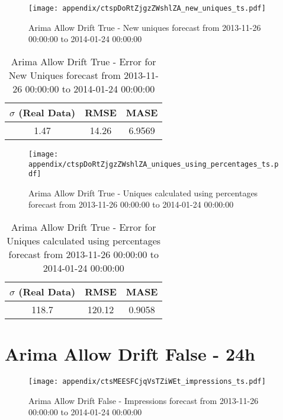 \begin{figure}[H] \begin{center} \leavevmode
\texttt{[image: appendix/ctspDoRtZjgzZWshlZA\_new\_uniques\_ts.pdf]} \caption[]{
Arima Allow Drift True - New uniques forecast from 2013-11-26 00:00:00 to 2014-01-24 00:00:00} \label{fig:appendix/ctspDoRtZjgzZWshlZA_new_uniques_ts.pdf} \end{center}
\end{figure}

\begin{table}[H]
\centering
\footnotesize
\begin{tabular}{ccc}
$\sigma$ (Real Data) & RMSE & MASE   \\ \hline
1.47 & 14.26 & 6.9569 \\
\end{tabular}

\vspace{0.5cm}

\caption[]{
Arima Allow Drift True - Error for New Uniques forecast from 2013-11-26 00:00:00 to 2014-01-24 00:00:00}
\end{table}

\begin{figure}[H] \begin{center} \leavevmode
\texttt{[image: appendix/ctspDoRtZjgzZWshlZA\_uniques\_using\_percentages\_ts.pdf]} \caption[]{
Arima Allow Drift True - Uniques calculated using percentages forecast from 2013-11-26 00:00:00 to 2014-01-24 00:00:00} \label{fig:appendix/ctspDoRtZjgzZWshlZA_uniques_using_percentages_ts.pdf} \end{center}
\end{figure}

\begin{table}[H]
\centering
\footnotesize
\begin{tabular}{ccc}
$\sigma$ (Real Data) & RMSE & MASE   \\ \hline
118.7 & 120.12 & 0.9058 \\
\end{tabular}

\vspace{0.5cm}

\caption[]{
Arima Allow Drift True - Error for Uniques calculated using percentages forecast from 2013-11-26 00:00:00 to 2014-01-24 00:00:00}
\end{table}

\section{Arima Allow Drift False - 24h}
\begin{figure}[H] \begin{center} \leavevmode
\texttt{[image: appendix/ctsMEESFCjqVsTZiWEt\_impressions\_ts.pdf]} \caption[]{
Arima Allow Drift False - Impressions forecast from 2013-11-26 00:00:00 to 2014-01-24 00:00:00} \label{fig:appendix/ctsMEESFCjqVsTZiWEt_impressions_ts.pdf} \end{center}
\end{figure}

